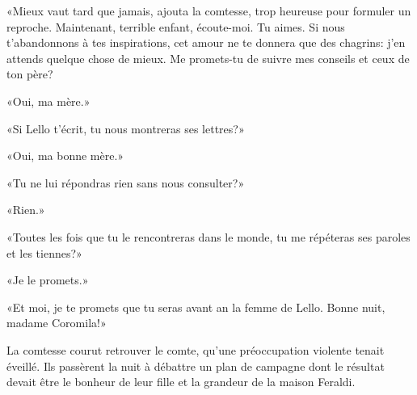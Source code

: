 «Mieux vaut tard que jamais, ajouta la comtesse, trop heureuse pour
formuler un reproche. Maintenant, terrible enfant, écoute-moi. Tu aimes.
Si nous t'abandonnons à tes inspirations, cet amour ne te donnera que
des chagrins: j'en attends quelque chose de mieux. Me promets-tu de
suivre mes conseils et ceux de ton père?

«Oui, ma mère.»

«Si Lello t'écrit, tu nous montreras ses lettres?»

«Oui, ma bonne mère.»

«Tu ne lui répondras rien sans nous consulter?»

«Rien.»

«Toutes les fois que tu le rencontreras dans le monde, tu me
répéteras ses paroles et les tiennes?»

«Je le promets.»

«Et moi, je te promets que tu seras avant an la femme de Lello.
Bonne nuit, madame Coromila!»

La comtesse courut retrouver le comte, qu'une préoccupation violente
tenait éveillé. Ils passèrent la nuit à débattre un plan de campagne
dont le résultat devait être le bonheur de leur fille et la grandeur de
la maison Feraldi.
